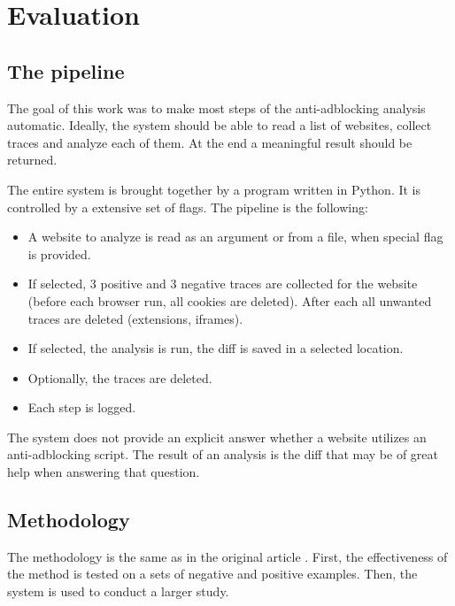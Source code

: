 \chapter{Evaluation}
\label{evaluation}


\section{The pipeline}

The goal of this work was to make most steps of the anti-adblocking analysis automatic.
Ideally, the system should be able to read a list of websites, collect traces and analyze
each of them. At the end a meaningful result should be returned.

The entire system is brought together by a program written in Python.
It is controlled by a extensive set of flags.
The pipeline is the following:
\begin{itemize}
  \item A website to analyze is read as an argument or from a file, when special flag is provided.
  \item If selected, 3 positive and 3 negative traces are collected for the website (before each browser run,
           all cookies are deleted). After each all unwanted traces are deleted (extensions, iframes).
  \item If selected, the analysis is run, the diff is saved in a selected location.
  \item Optionally, the traces are deleted.
  \item Each step is logged.
\end{itemize}

The system does not provide an explicit answer whether a website utilizes an anti-adblocking script.
The result of an analysis is the diff that may be of great help when answering that question.

\section{Methodology}

The methodology is the same as in the original article \cite{DBLP:conf/ndss/ZhuHQSY18}.
First, the effectiveness of the method is tested on a sets of negative and positive examples.
Then, the system is used to conduct a larger study.

